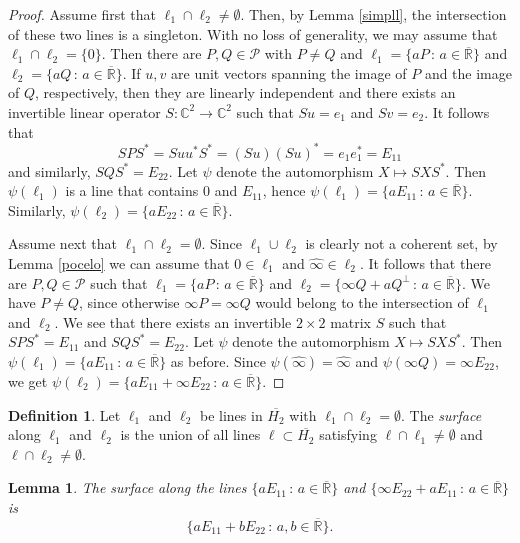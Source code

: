 \documentclass[10pt,a4paper]{amsart}
\providecommand{\index}[1]{}
\newcommand\oH{{\overline{H_2}}}
\newcommand\oi{{\widehat{\infty}}}
\newcommand\oR{{\overline{\mathbb{R}}}}
\newtheorem{lemma}[theorem]{Lemma}
\theoremstyle{definition}
\newtheorem{definition}[theorem]{Definition}
\theoremstyle{remark}
\numberwithin{subsection}{section}
\numberwithin{equation}{section}
\begin{document}
\begin{proof}
Assume first that $\ell_1 \cap \ell_2 \not=\emptyset$. Then, by Lemma \ref{simpll}, the intersection of these two lines is a singleton. With no loss of generality, we may assume that  $\ell_1 \cap \ell_2= \{ 0 \}$. Then there are $P,Q \in \mathcal{P}$ with $P \not=Q$ and $\ell_1 = 
\{ a P \, : \, a \in {\oR} \}$ and  $\ell_2 = 
\{ a Q \, : \, a \in {\oR} \}$. If $u,v$ are unit vectors spanning the image of $P$ and the image of $Q$, respectively, then they are linearly independent and there exists an invertible linear operator $S \colon \mathbb{C}^2 \to \mathbb{C}^2$ such that $Su= e_1$ and $Sv = e_2$. 
It follows that 
\[
SPS^\ast = Suu^*S^* = (Su)(Su)^* = e_1e_1^*= E_{11}
\]
and similarly, $SQS^\ast = E_{22}$. 
Let $\psi$ denote the automorphism $X\mapsto SXS^*$. 
Then $\psi(\ell_1)$ is a line that contains $0$ and $E_{11}$, hence $\psi(\ell_1)= \{ a E_{11} \, : \, a \in {\oR} \}$.
Similarly, $\psi(\ell_2) = \{ a E_{22} \, : \, a \in {\oR} \}$.

Assume next that $\ell_1 \cap \ell_2 =\emptyset$. Since $\ell_1\cup \ell_2$ is clearly not a coherent set, by Lemma \ref{pocelo} we can assume that $0 \in \ell_1$ and $\oi \in \ell_2$. It follows that there are $P,Q \in \mathcal{P}$ such that $\ell_1 = 
\{ a P \, : \, a \in {\oR} \}$ and  $\ell_2 = 
\{ \infty Q + aQ^\perp \, : \, a \in {\oR} \}$. We have $P \not=Q$, since otherwise $\infty P = \infty Q$ would belong to the intersection of $\ell_1$ and $\ell_2$. 
We see that there exists an invertible $2 \times 2$ matrix $S$ such that $SPS^\ast = E_{11}$ and $SQS^\ast = E_{22}$.
Let $\psi$ denote the automorphism $X\mapsto SXS^*$. 
Then $\psi(\ell_1) = \{ a E_{11} \, : \, a \in {\oR} \}$ as before. 
Since $\psi(\oi)=\oi$ and $\psi(\infty Q)=\infty E_{22}$, we get $\psi(\ell_2) = \{  a E_{11} +\infty E_{22}  \, : \, a \in {\oR} \}$.
\end{proof}

\begin{definition}\label{surface}
Let $\ell_1$ and $\ell_2$ be lines in $\oH$ with $\ell_1 \cap \ell_2 = \emptyset$. The \emph{surface} \index{surface} along $\ell_1$ and $\ell_2$ is the union of all lines $\ell \subset \oH$ satisfying $\ell \cap \ell_1 \not= \emptyset$ and $\ell \cap \ell_2 \not= \emptyset$. 
\end{definition}

\begin{lemma}\label{standsurface}
The surface along the lines  $\{ a E_{11} \, : \, a \in {\oR} \}$ and $\{  \infty E_{22}  + a E_{11} \, : \, a \in {\oR} \}$ is
\[
\{ a E_{11} + b E_{22} \, : \, a,b \in {\oR} \}.
\]
\end{lemma}
\end{document}
